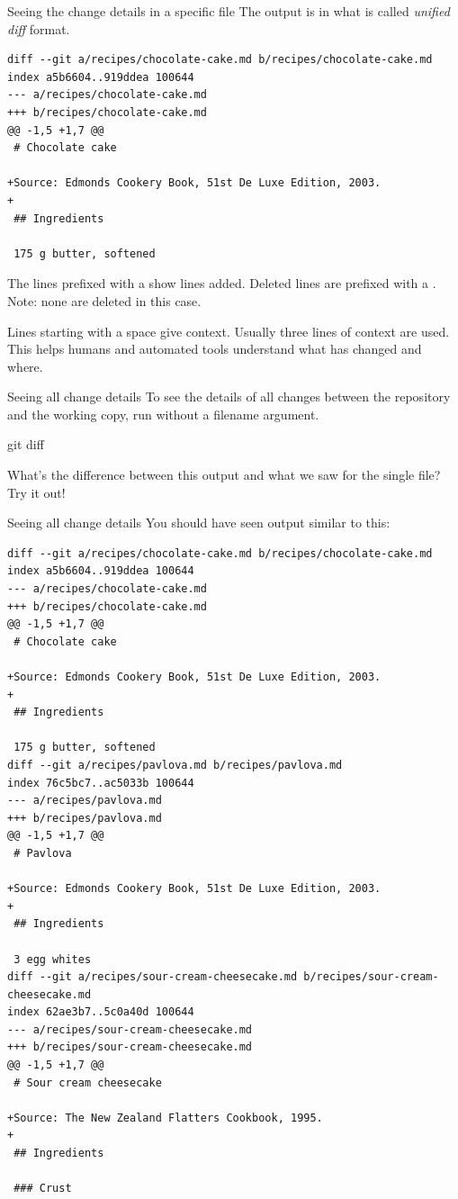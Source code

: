 \documentclass{git_course}
\begin{document}
\begin{frame}[fragile]{Seeing the change details in a specific file}
    The output is in what is called \emph{unified diff} format.
    \begin{verbatim}
diff --git a/recipes/chocolate-cake.md b/recipes/chocolate-cake.md
index a5b6604..919ddea 100644
--- a/recipes/chocolate-cake.md
+++ b/recipes/chocolate-cake.md
@@ -1,5 +1,7 @@
 # Chocolate cake

+Source: Edmonds Cookery Book, 51st De Luxe Edition, 2003.
+
 ## Ingredients

 175 g butter, softened
    \end{verbatim}
    The lines prefixed with a \code{+} show lines added.  Deleted lines are
    prefixed with a \code{-}.  Note: none are deleted in this case.

    Lines starting with a space give context.  Usually three lines of
    context are used.  This helps humans and automated tools understand what
    has changed and where.
\end{frame}

\begin{frame}[fragile]{Seeing all change details}
    To see the details of all changes between the repository and the working
    copy, run  without a filename argument.

    \begin{shellcode}
        git diff
    \end{shellcode}

    What's the difference between this output and what we saw for the single
    file?  Try it out!
\end{frame}

\begin{frame}[fragile]{Seeing all change details}
    You should have seen output similar to this:
    \begin{verbatim}
diff --git a/recipes/chocolate-cake.md b/recipes/chocolate-cake.md
index a5b6604..919ddea 100644
--- a/recipes/chocolate-cake.md
+++ b/recipes/chocolate-cake.md
@@ -1,5 +1,7 @@
 # Chocolate cake

+Source: Edmonds Cookery Book, 51st De Luxe Edition, 2003.
+
 ## Ingredients

 175 g butter, softened
diff --git a/recipes/pavlova.md b/recipes/pavlova.md
index 76c5bc7..ac5033b 100644
--- a/recipes/pavlova.md
+++ b/recipes/pavlova.md
@@ -1,5 +1,7 @@
 # Pavlova

+Source: Edmonds Cookery Book, 51st De Luxe Edition, 2003.
+
 ## Ingredients

 3 egg whites
diff --git a/recipes/sour-cream-cheesecake.md b/recipes/sour-cream-cheesecake.md
index 62ae3b7..5c0a40d 100644
--- a/recipes/sour-cream-cheesecake.md
+++ b/recipes/sour-cream-cheesecake.md
@@ -1,5 +1,7 @@
 # Sour cream cheesecake

+Source: The New Zealand Flatters Cookbook, 1995.
+
 ## Ingredients

 ### Crust
    \end{verbatim}
\end{frame}
\end{document}
